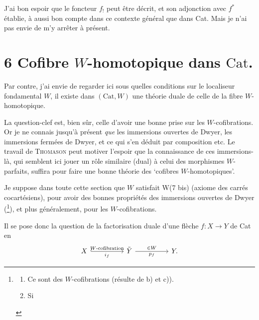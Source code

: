 J'ai bon espoir que le foncteur $f_!$ peut être décrit, et son adjonction avec $f^*$ établie, à aussi bon compte dans ce contexte général que dans Cat. Mais je n'ai pas envie de m'y arrêter à présent.

\section*{6 Cofibre $W$-homotopique dans $\mathrm{Cat}$.}

Par contre, j'ai envie de regarder ici sous quelles conditions sur le localiseur fondamental $W$, il existe dans $(\mathrm{Cat},W)$ une théorie duale de celle de la fibre $W$-homotopique.

La question-clef est, bien sûr, celle d'avoir une bonne prise sur les $W$-cofibrations. Or je ne connais jusqu'à présent \textit{que} les immersions ouvertes de Dwyer, les immersions fermées de Dwyer, et ce qui s'en déduit par composition etc. Le travail de \textsc{Thomason} peut motiver l'espoir que la connaissance de ces immersions-là, qui semblent ici jouer un rôle similaire (dual) à celui des morphismes $W$-parfaits, suffira pour faire une bonne théorie des `cofibres $W$-homotopiques'.

{\reversemarginpar\marginnote{\textbar\textbar\textbar}}Je suppose dans toute cette section que $W$ satisfait W(7 bis) (axiome des carrés cocartésiens), pour avoir des bonnes propriétés des immersions ouvertes de Dwyer (\footnote[124]{\begin{enumerate}
\item[a)] Ce sont des $W$-cofibrations (résulte de b) et c)).
\item[b)] Si
\end{enumerate}}), et plus généralement, pour les $W$-cofibrations. %


Il se pose donc la question de la factorisation duale d'une flèche $f : X \longrightarrow Y$ de Cat en
\[
\begin{tikzcd}[column sep=huge]
X \arrow[r, hook, "W\text{-cofibration}", "i_f"'] & \tilde{Y} \arrow[r, "\in W", "p_f"'] & Y.
\end{tikzcd}
\]

